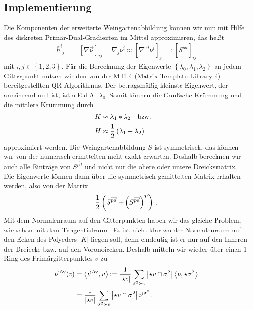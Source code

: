   \subsection{Implementierung}
    Die Komponenten der erweiterte Weingartenabbildung können wir nun mit Hilfe des diskreten Primär-Dual-Gradienten im Mittel approximieren, das heißt
    \begin{align}
      \bar{h}^{i}_{\phantom{i}j} &= \left[ \nabla\vec{\nu} \right]_{ij} = \nabla_{j}\nu^{i}
                                 \approx \left[ \nabla^{\overline{pd}}\nu^{i} \right]_{j}
                                 =: \left[ S^{\overline{pd}} \right]_{ij}
    \end{align}
    mit \( i,j \in \left\{ 1,2,3 \right\} \).
    Für die Berechnung der Eigenwerte \( \left\{ \lambda_{0}, \lambda_{1}, \lambda_{2} \right\} \) an jedem Gitterpunkt 
    nutzen wir den von der MTL4 (Matrix Template Library 4) bereitgestellten QR-Algorithmus.
    Der betragsmäßig kleinste Eigenwert, der annährend null ist, ist o.E.d.A. \( \lambda_{0} \).
    Somit können die Gaußsche Krümmung und die mittlere Krümmung durch
    \begin{align}
      K &\approx \lambda_{1}*\lambda_{2} \quad\text{bzw.}\quad \\
      H &\approx \frac{1}{2}\left( \lambda_{1}+\lambda_{2}\right)    
    \end{align}
    approximiert werden.
    Die Weingartenabbildung \( S \) ist symmetrisch, das können wir von der numerisch ermittelten nicht exakt erwarten.
    Deshalb berechnen wir auch alle Einträge von \( S^{\overline{pd}} \) und nicht nur die obere oder untere Dreicksmatrix. 
    Die Eigenwerte können dann über die symmetrisch gemittelten Matrix erhalten werden, also von der Matrix
    \begin{align}
      \frac{1}{2} \left( S^{\overline{pd}} + \left( S^{\overline{pd}} \right)^{T} \right) \,\text{.}
    \end{align}
    Mit dem Normalenraum auf den Gitterpunkten haben wir das gleiche Problem, wie schon mit dem Tangentialraum.
    Es ist nicht klar wo der Normalenraum auf den Ecken des Polyeders \( |K| \) liegen soll, denn eindeutig ist er nur auf den Inneren der Dreiecke
    bzw. auf den Voronoiecken.
    Deshalb mitteln wir wieder über einen 1-Ring des Primärgitterpunktes \( v \) zu
    \begin{align}
    \label{eqNormalMittel}
    \begin{aligned}
      \vec{\nu}^{\,\text{Av}}(v) &= \left\langle \vec{\nu}^{\,\text{Av}}, v \right\rangle 
          := \frac{1}{\left| \star v \right|} \sum_{\sigma^{2}\succ v} \left| \star v \cap \sigma^{2}\right| 
                      \left\langle \vec{\nu}, \star\sigma^{2} \right\rangle \\
          &= \frac{1}{\left| \star v \right|} \sum_{\sigma^{2}\succ v} \left| \star v \cap \sigma^{2}\right| 
                                          \vec{\nu}^{\,\sigma^{2}} \,\text{.}
    \end{aligned}
    \end{align}
